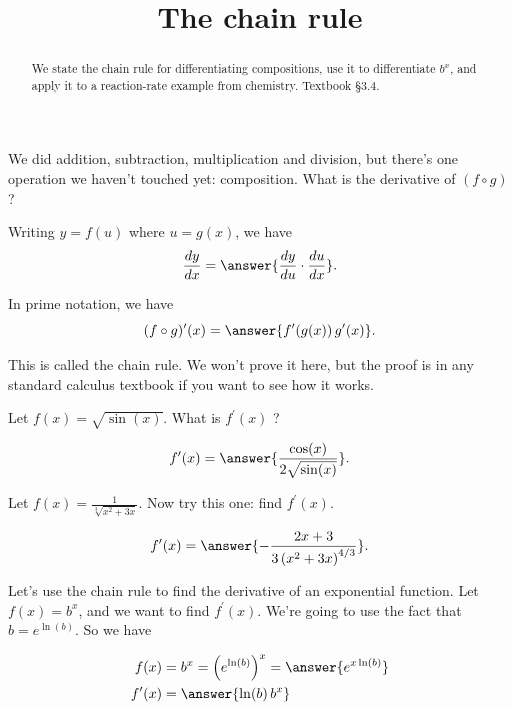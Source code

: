 \documentclass{ximera}
\title{The chain rule}
\begin{document}
\begin{abstract}
We state the chain rule for differentiating compositions, use it to differentiate $b^x$, and apply it to a reaction-rate example from chemistry. Textbook §3.4.
\end{abstract}
\maketitle

We did addition, subtraction, multiplication and division, but there's one operation we haven't touched yet: composition. What is the derivative of $(f \circ g)$ ?

Writing $y=f(u)$ where $u=g(x)$, we have
\[
\frac{dy}{dx}=\answer{\frac{dy}{du}\cdot\frac{du}{dx}}.
\]

In prime notation, we have
\[
(f \circ g)^{\prime}(x)=\answer{f^{\prime}(g(x))\,g^{\prime}(x)}.
\]

This is called the chain rule. We won't prove it here, but the proof is in any standard calculus textbook if you want to see how it works.

\begin{example}
\label{example:6-3}
Let $f(x)=\sqrt{\sin (x)}$. What is $f^{\prime}(x)$ ?

\[
f^{\prime}(x)=\answer{\frac{\cos(x)}{2\sqrt{\sin(x)}}}.
\]
\end{example}

\begin{exercise}
\label{exercise:6-4}
Let $f(x)=\frac{1}{\sqrt[3]{x^{2}+3 x}}$. Now try this one: find $f^{\prime}(x)$.

\[
f^{\prime}(x)=\answer{-\frac{2x+3}{3\left(x^{2}+3x\right)^{4/3}}}.
\]
\end{exercise}

Let's use the chain rule to find the derivative of an exponential function. Let
$f(x)=b^{x}$, and we want to find $f^{\prime}(x)$. We're going to use the fact that $b=e^{\ln (b)}$. So we have

\[
\begin{aligned}
f(x) & = b^{x} = \left(e^{\ln (b)}\right)^{x} = \answer{e^{x\ln(b)}} \\
f^{\prime}(x) & = \answer{\ln(b)\, b^{x}}
\end{aligned}
\]
\end{document}
